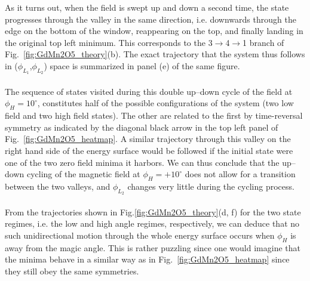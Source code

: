 As it turns out, when the field is swept up and down a second time, the state progresses through the valley in the same direction, i.e. downwards through the edge on the bottom of the window, reappearing on the top, and finally landing in the original top left minimum.
This corresponds to the 3$\rightarrow$4$\rightarrow$1 branch of Fig.~\ref{fig:GdMn2O5_theory}(b).
The exact trajectory that the system thus follows in ($\phi_{L_1}$,$\phi_{L_2}$) space is summarized in panel (e) of the same figure.
\\\\
The sequence of states visited during this double up--down cycle of the field at $\phi_H = 10^\circ$, constitutes half of the possible configurations of the system (two low field and two high field states).
The other are related to the first by time-reversal symmetry as indicated by the diagonal black arrow in the top left panel of Fig.~\ref{fig:GdMn2O5_heatmap}.
A similar trajectory through this valley on the right hand side of the energy surface would be followed if the initial state were one of the two zero field minima it harbors. 
We can thus conclude that the up--down cycling of the magnetic field at $\phi_H=+10^\circ$ does not allow for a transition between the two valleys, and $\phi_{L_2}$ changes very little during the cycling process.
\\\\
From the trajectories shown in Fig.\ref{fig:GdMn2O5_theory}(d, f) for the two state regimes, i.e. the low and high angle regimes, respectively, we can deduce that no such unidirectional motion through the whole energy surface occurs when $\phi_H$ is away from the magic angle.
This is rather puzzling since one would imagine that the minima behave in a similar way as in Fig.~\ref{fig:GdMn2O5_heatmap} since they still obey the same symmetries.

